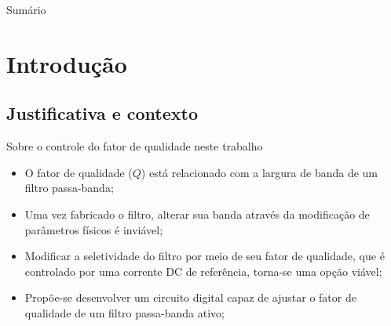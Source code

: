 





\AtBeginSubsection[ ]
{
\begin{frame}
    \footnotesize
    \tableofcontents
    [
        currentsection,
        currentsubsection,
        subsectionstyle=show/shaded/hide
    ]
\end{frame}
}


{
    \maketitle
}


\begin{frame}[shrink]{Sumário}
\footnotesize
        \setcounter{tocdepth}{3} %
        \vspace{0.3cm}
        \tableofcontents%
        \vspace{0.3cm}
\end{frame}


\section{Introdução}


\subsection{Justificativa e contexto}

\begin{frame}{Sobre o controle do fator de qualidade neste trabalho}

\begin{itemize}
    \item O fator de qualidade ($Q$) está relacionado com a largura de banda de um filtro passa-banda;
    \item Uma vez fabricado o filtro, alterar sua banda através da modificação de parâmetros físicos é inviável;
    \item Modificar a seletividade do filtro por meio de seu fator de qualidade, que é controlado por uma corrente DC de referência, torna-se uma opção viável;
    \item Propõe-se desenvolver um circuito digital capaz de ajustar o fator de qualidade de um filtro passa-banda ativo;
    \end{itemize}
\end{frame}


